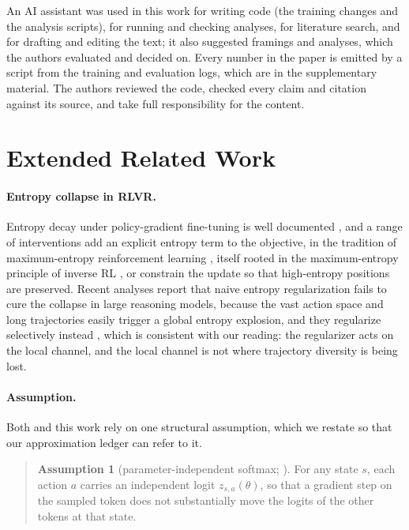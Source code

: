 \documentclass[11pt]{article}
\begin{document}
An AI assistant was used in this work for writing code (the training changes and
the analysis scripts), for running and checking analyses, for literature search,
and for drafting and editing the text; it also suggested framings and analyses,
which the authors evaluated and decided on. Every number in the paper is emitted
by a script from the training and evaluation logs, which are in the supplementary
material. The authors reviewed the code, checked every claim and citation against
its source, and take full responsibility for the content.




\appendix

\section{Extended Related Work}
\label{sec:related}
\paragraph{Entropy collapse in RLVR.}
Entropy decay under policy-gradient fine-tuning is well documented
\citep{cui2025bentropy}, and a range of interventions add an explicit entropy term
to the objective, in the tradition of maximum-entropy reinforcement learning
\citep{haarnoja2018soft}, itself rooted in the maximum-entropy principle of inverse
RL \citep{ziebart2008maximum}, or constrain the update so that high-entropy positions
are preserved. Recent analyses report that naive entropy regularization fails to cure
the collapse in large reasoning models, because the vast action space and long
trajectories easily trigger a global entropy explosion, and they regularize
selectively instead \citep{rethinkingentropyreg}, which is consistent with
our reading: the regularizer acts on the local channel, and the local channel is
not where trajectory diversity is being lost.

\paragraph{Assumption.}
Both \citet{steer} and this work rely on one structural assumption, which we restate
so that our approximation ledger can refer to it.

\begin{quote}
\textbf{Assumption 1} (parameter-independent softmax; \citealp{steer}).
\label{ass:indep}
For any state $s$, each action $a$ carries an independent logit $z_{s,a}(\theta)$, so
that a gradient step on the sampled token does not substantially move the logits of
the other tokens at that state.
\end{quote}
\end{document}
